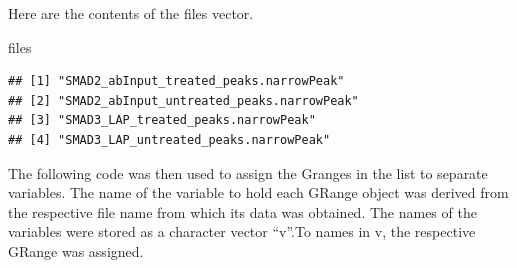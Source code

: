 \documentclass[]{article}
\newenvironment{Shaded}{\begin{snugshade}}{\end{snugshade}}
\newcommand{\CharTok}[1]{\textcolor[rgb]{0.31,0.60,0.02}{#1}}
\newcommand{\CommentTok}[1]{\textcolor[rgb]{0.56,0.35,0.01}{\textit{#1}}}
\newcommand{\ControlFlowTok}[1]{\textcolor[rgb]{0.13,0.29,0.53}{\textbf{#1}}}
\newcommand{\DataTypeTok}[1]{\textcolor[rgb]{0.13,0.29,0.53}{#1}}
\newcommand{\KeywordTok}[1]{\textcolor[rgb]{0.13,0.29,0.53}{\textbf{#1}}}
\newcommand{\NormalTok}[1]{#1}
\newcommand{\StringTok}[1]{\textcolor[rgb]{0.31,0.60,0.02}{#1}}
\begin{document}
\begin{Shaded}
\end{Shaded}

Here are the contents of the files vector.

\begin{Shaded}
\begin{Highlighting}[]
\NormalTok{files}
\end{Highlighting}
\end{Shaded}

\begin{verbatim}
## [1] "SMAD2_abInput_treated_peaks.narrowPeak"  
## [2] "SMAD2_abInput_untreated_peaks.narrowPeak"
## [3] "SMAD3_LAP_treated_peaks.narrowPeak"      
## [4] "SMAD3_LAP_untreated_peaks.narrowPeak"
\end{verbatim}

The following code was then used to assign the Granges in the list to
separate variables. The name of the variable to hold each GRange object
was derived from the respective file name from which its data was
obtained. The names of the variables were stored as a character vector
``v''.To names in v, the respective GRange was assigned.

\begin{Shaded}
\end{Shaded}
\end{document}
